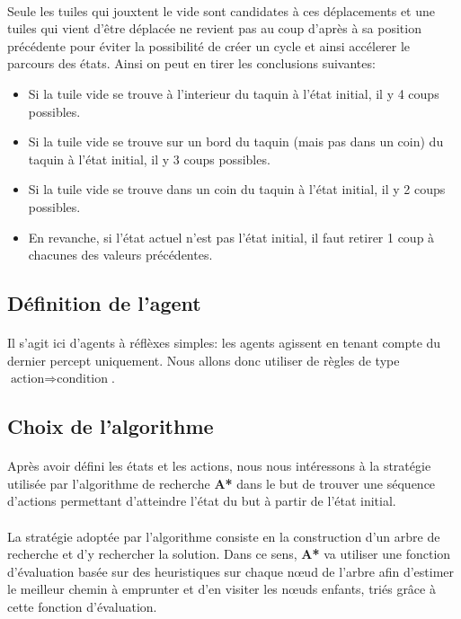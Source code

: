 \documentclass[10pt,a4paper]{report}
\begin{document}
\paragraph{}{Seule les tuiles qui jouxtent le vide sont candidates à ces déplacements et une tuiles qui vient d'être déplacée ne revient pas au coup d'après à sa position précédente pour éviter la possibilité de créer un cycle et ainsi accélerer le parcours des états. Ainsi on peut en tirer les conclusions suivantes:}
\begin{itemize}
\item Si la tuile vide se trouve à l'interieur du taquin à l'état initial, il y 4 coups possibles.
\item Si la tuile vide se trouve sur un bord du taquin (mais pas dans un coin) du taquin à l'état initial, il y 3 coups possibles.
\item Si la tuile vide se trouve dans un coin du taquin à l'état initial, il y 2 coups possibles.
\item En revanche, si l'état actuel n'est pas l'état initial, il faut retirer 1 coup à chacunes des valeurs précédentes.
\end{itemize}
\subsection{Définition de l'agent}
\paragraph{}{Il s'agit ici d'agents à réflèxes simples: les agents agissent en tenant compte du dernier percept uniquement. Nous allons donc utiliser de règles de type $\textrm{action} \Longrightarrow \textrm{condition}$}.
\subsection{Choix de l’algorithme}
\paragraph{}{Après avoir défini les états et les actions, nous nous intéressons à la stratégie utilisée par l’algorithme de recherche \textbf{A*} dans le but de trouver une séquence d’actions permettant d’atteindre l’état du but à partir de l’état initial.}
\paragraph{}{La stratégie adoptée par l’algorithme consiste en la construction d'un arbre de recherche et d’y rechercher la solution. Dans ce sens, \textbf{A*} va utiliser une fonction d'évaluation basée sur des heuristiques sur chaque nœud de l'arbre afin d’estimer le meilleur chemin à emprunter et d'en visiter les nœuds enfants, triés grâce à cette fonction d'évaluation.}
\end{document}
